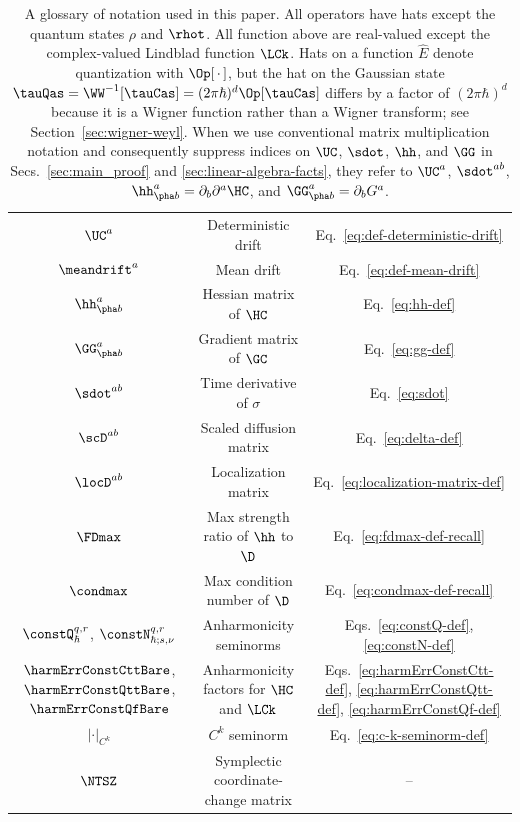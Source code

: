 \documentclass{article}
\numberwithin{equation}{section}
\begin{document}
\begin{table}
\begin{tabular}{c|c|c}
    $\UC^a$ & Deterministic drift 
    & Eq.~\eqref{eq:def-deterministic-drift} \\
    $\meandrift^a$ & Mean drift 
    & Eq.~\eqref{eq:def-mean-drift} \\
    $\hh^a_{\pha b}$ & 
    Hessian matrix of $\HC$ 
    &  Eq.~\eqref{eq:hh-def}\\
    $\GG^a_{\pha b}$ & Gradient matrix of $\GC$ 
    &  Eq.~\eqref{eq:gg-def}\\
    $\sdot^{ab}$ & Time derivative of $\sigma$ &  Eq.~\eqref{eq:sdot}\\
    $\scD^{ab}$ & Scaled diffusion matrix &  Eq.~\eqref{eq:delta-def} \\
    $\locD^{ab}$ & Localization matrix &  Eq.~\eqref{eq:localization-matrix-def} \\
    $\FDmax$ & Max strength ratio of $\hh$ to $\D$ &  
    Eq.~\eqref{eq:fdmax-def-recall} \\
    $\condmax$ & Max condition number of $\D$ &  
    Eq.~\eqref{eq:condmax-def-recall}\\
    $\constQ^{q,r}_{\hbar}$, $\constN^{q,r}_{\hbar;s,\nu}$
    & Anharmonicity seminorms &
    Eqs.~\eqref{eq:constQ-def}, \eqref{eq:constN-def}\\
    $\harmErrConstCttBare$, $\harmErrConstQttBare$, $\harmErrConstQfBare$ & Anharmonicity factors for $\HC$ and $\LCk$ &  Eqs.~\eqref{eq:harmErrConstCtt-def}, \eqref{eq:harmErrConstQtt-def}, \eqref{eq:harmErrConstQf-def} \\
    $|\cdot|_{C^k}$ & $C^k$ seminorm
    &  Eq.~\eqref{eq:c-k-seminorm-def}
    \\
    $\NTSZ$ & Symplectic coordinate-change matrix  & -- 
 \end{tabular}
     \caption{A glossary of notation used in this paper. All operators have hats except the quantum states $\rho$ and $\rhot$. All function above are real-valued except the complex-valued Lindblad function $\LCk$. Hats on a function $\hat{E}$ denote quantization with $\Op[\,\cdot\,]$, but the hat on the Gaussian state $\tauQas = \WW^{-1}[\tauCas] = (2\pi\hbar)^d \Op[\tauCas]$ differs by a factor of $(2\pi\hbar)^d$ because it is a Wigner function rather than a Wigner transform; see Section~\ref{sec:wigner-weyl}. When we use conventional matrix multiplication notation and consequently suppress indices on $\UC$, $\sdot$, $\hh$, and $\GG$ in Secs.~\ref{sec:main_proof} and \ref{sec:linear-algebra-facts}, they refer to $\UC^a$, $\sdot^{ab}$, $\hh^a_{\pha b} = \partial_b \partial^a \HC$, and $\GG^a_{\pha b} = \partial_b G^a$.}
     \label{tab:glossary}
 \end{table}
\end{document}
